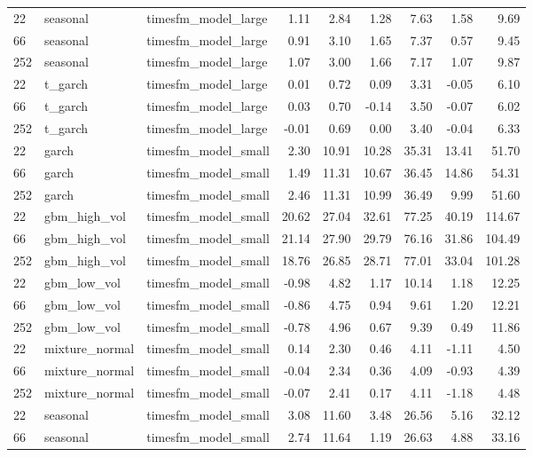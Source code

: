 {\begin{tabular}{lllrrrrrr}
\midrule
22 & seasonal & timesfm\_model\_large & 1.11 & 2.84 & 1.28 & 7.63 & 1.58 & 9.69 \\
66 & seasonal & timesfm\_model\_large & 0.91 & 3.10 & 1.65 & 7.37 & 0.57 & 9.45 \\
252 & seasonal & timesfm\_model\_large & 1.07 & 3.00 & 1.66 & 7.17 & 1.07 & 9.87 \\
\midrule
22 & t\_garch & timesfm\_model\_large & 0.01 & 0.72 & 0.09 & 3.31 & -0.05 & 6.10 \\
66 & t\_garch & timesfm\_model\_large & 0.03 & 0.70 & -0.14 & 3.50 & -0.07 & 6.02 \\
252 & t\_garch & timesfm\_model\_large & -0.01 & 0.69 & 0.00 & 3.40 & -0.04 & 6.33 \\
\midrule
22 & garch & timesfm\_model\_small & 2.30 & 10.91 & 10.28 & 35.31 & 13.41 & 51.70 \\
66 & garch & timesfm\_model\_small & 1.49 & 11.31 & 10.67 & 36.45 & 14.86 & 54.31 \\
252 & garch & timesfm\_model\_small & 2.46 & 11.31 & 10.99 & 36.49 & 9.99 & 51.60 \\
\midrule
22 & gbm\_high\_vol & timesfm\_model\_small & 20.62 & 27.04 & 32.61 & 77.25 & 40.19 & 114.67 \\
66 & gbm\_high\_vol & timesfm\_model\_small & 21.14 & 27.90 & 29.79 & 76.16 & 31.86 & 104.49 \\
252 & gbm\_high\_vol & timesfm\_model\_small & 18.76 & 26.85 & 28.71 & 77.01 & 33.04 & 101.28 \\
\midrule
22 & gbm\_low\_vol & timesfm\_model\_small & -0.98 & 4.82 & 1.17 & 10.14 & 1.18 & 12.25 \\
66 & gbm\_low\_vol & timesfm\_model\_small & -0.86 & 4.75 & 0.94 & 9.61 & 1.20 & 12.21 \\
252 & gbm\_low\_vol & timesfm\_model\_small & -0.78 & 4.96 & 0.67 & 9.39 & 0.49 & 11.86 \\
\midrule
22 & mixture\_normal & timesfm\_model\_small & 0.14 & 2.30 & 0.46 & 4.11 & -1.11 & 4.50 \\
66 & mixture\_normal & timesfm\_model\_small & -0.04 & 2.34 & 0.36 & 4.09 & -0.93 & 4.39 \\
252 & mixture\_normal & timesfm\_model\_small & -0.07 & 2.41 & 0.17 & 4.11 & -1.18 & 4.48 \\
\midrule
22 & seasonal & timesfm\_model\_small & 3.08 & 11.60 & 3.48 & 26.56 & 5.16 & 32.12 \\
66 & seasonal & timesfm\_model\_small & 2.74 & 11.64 & 1.19 & 26.63 & 4.88 & 33.16 \\

\end{tabular}}
